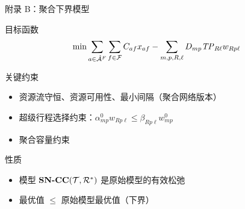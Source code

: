 \begin{frame}{附录 B：聚合下界模型}
\small
\begin{block}{目标函数}
\vspace{-0.3cm}
\[\min\sum_{a\in\hat{\mathcal{A}}^F}\sum_{f\in\mathcal{F}} C_{af}x_{af}-\sum_{m,p,R,\ell}D_{mp}\mathit{TP}_{R\ell}w_{Rp\ell}\]
\end{block}
\vspace{0.1cm}
\begin{block}{关键约束}
\begin{itemize}
    \item 资源流守恒、资源可用性、最小间隔（聚合网络版本）
    \item 超级行程选择约束：$\alpha^0_{mp}w_{Rp\ell}\le \beta_{Rp\ell}w^0_{mp}$
    \item 聚合容量约束
\end{itemize}
\end{block}
\vspace{0.1cm}
\begin{block}{性质}
\begin{itemize}
    \item 模型 $\textbf{SN-CC}({\mathcal{T},\mathcal{R}^{*}})$ 是原始模型的有效松弛
    \item 最优值 $\le$ 原始模型最优值（下界）
\end{itemize}
\end{block}
\end{frame}


